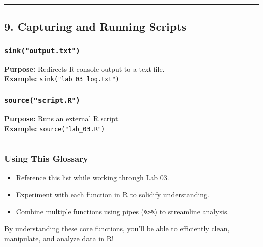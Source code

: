 \documentclass[
  11pt,
]{article}
\providecommand{\tightlist}{%
  \setlength{\itemsep}{0pt}\setlength{\parskip}{0pt}}
\begin{document}
\begin{center}\rule{0.5\linewidth}{0.5pt}\end{center}

\subsection{\texorpdfstring{\textbf{9. Capturing and Running
Scripts}}{9. Capturing and Running Scripts}}\label{capturing-and-running-scripts}

\subsubsection{\texorpdfstring{\textbf{\texttt{sink("output.txt")}}}{sink("output.txt")}}\label{sinkoutput.txt}

\textbf{Purpose:} Redirects R console output to a text file.\\
\textbf{Example:} \texttt{sink("lab\_03\_log.txt")}

\subsubsection{\texorpdfstring{\textbf{\texttt{source("script.R")}}}{source("script.R")}}\label{sourcescript.r}

\textbf{Purpose:} Runs an external R script.\\
\textbf{Example:} \texttt{source("lab\_03.R")}

\begin{center}\rule{0.5\linewidth}{0.5pt}\end{center}

\subsubsection{\texorpdfstring{\textbf{Using This
Glossary}}{Using This Glossary}}\label{using-this-glossary}

\begin{itemize}
\tightlist
\item
  Reference this list while working through Lab 03.
\item
  Experiment with each function in R to solidify understanding.
\item
  Combine multiple functions using pipes (\texttt{\%\textgreater{}\%})
  to streamline analysis.
\end{itemize}

By understanding these core functions, you'll be able to efficiently
clean, manipulate, and analyze data in R!
\end{document}
